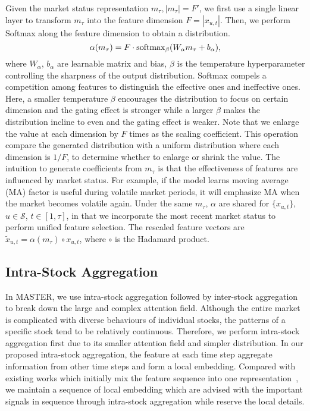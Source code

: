 Given the market status representation $m_\tau, |m_\tau|=F'$,  
we first use a single linear layer to transform $m_\tau$ into the feature dimension $F=|x_{u,t}|$.
Then, we perform Softmax along the feature dimension to obtain a distribution. 
$$ \alpha(m_\tau) = F\cdot {\rm softmax}_{\beta}(W_{\alpha}m_\tau+b_{\alpha}),$$
where $W_{\alpha}$, $b_{\alpha}$ are learnable matrix and bias, $\beta$ is the temperature hyperparameter controlling the sharpness of the output distribution.
Softmax compels a competition among features to distinguish the effective ones and ineffective ones.
Here, a smaller temperature $\beta$ encourages the distribution to focus on certain dimension and the gating effect is stronger while a larger $\beta$ makes the distribution incline to even and the gating effect is weaker. 
Note that we enlarge the value at each dimension by $F$ times as the scaling coefficient. This operation compare the generated distribution with a uniform distribution where each dimension is $1/F$, to determine whether to enlarge or shrink the value.  
The intuition to generate coefficients from $m_\tau$ is that the effectiveness of features are influenced by market status. For example, if the model learns moving average (MA) factor is useful during volatile market periods, it will emphasize MA when the market becomes volatile again.
Under the same $m_\tau$, $\alpha$ are shared for $\{x_{u,t}\}$, $u\in \mathcal{S}$, $t\in [1, \tau]$, in that we incorporate the most recent market status to perform unified feature selection. The rescaled feature vectors are $ \tilde{x}_{u,t} = \alpha(m_\tau) \circ x_{u,t}$, where $\circ$ is the Hadamard product. 

\subsection{Intra-Stock Aggregation}
In MASTER, we use intra-stock aggregation followed by inter-stock aggregation to break down the large and complex attention field.
Although the entire market is complicated with diverse behaviours of individual stocks, the patterns of a specific stock tend to be relatively continuous.
Therefore, we perform intra-stock aggregation first due to its smaller attention field and simpler distribution.
In our proposed intra-stock aggregation, the feature at each time step aggregate information from other time steps and form a local embedding. 
Compared with existing works which initially mix the feature sequence into one representation~\cite{yoo2021accurate}, we maintain a sequence of local embedding which are advised with the important signals in sequence through intra-stock aggregation while reserve the local details.

